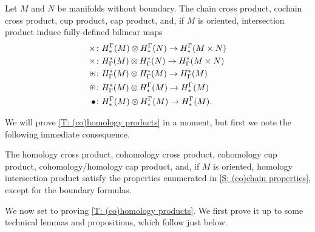 \begin{theorem}\label{T: (co)homology products}
	Let $M$ and $N$ be manifolds without boundary.
	The chain cross product, cochain cross product, cup product, cap product, and, if $M$ is oriented, intersection product induce fully-defined bilinear maps
	\begin{align*}
		\times \colon & H^\Gamma_*(M) \otimes H^\Gamma_*(N) \to H^\Gamma_*(M \times N)\\
		\times \colon & H_\Gamma^*(M) \otimes H_\Gamma^*(N) \to H_\Gamma^*(M \times N)\\
		\uplus \colon & H_\Gamma^*(M) \otimes H_\Gamma^*(M) \to H_\Gamma^*(M)\\
		\nplus \colon & H_\Gamma^*(M) \otimes H^\Gamma_*(M) \to H^\Gamma_*(M)\\
		\bullet \colon & H^\Gamma_*(M) \otimes H^\Gamma_*(M) \to H^\Gamma_*(M).\\
	\end{align*}
\end{theorem}

We will prove \cref{T: (co)homology products} in a moment, but first we note the following immediate consequence.

\begin{theorem}
	The homology cross product, cohomology cross product, cohomology cup product, cohomology/homology cap product, and, if $M$ is oriented, homology intersection product satisfy the properties enumerated in \cref{S: (co)chain properties}, except for the boundary formulas.
\end{theorem}

We now set to proving \cref{T: (co)homology products}.
We first prove it up to some technical lemmas and propositions, which follow just below.


